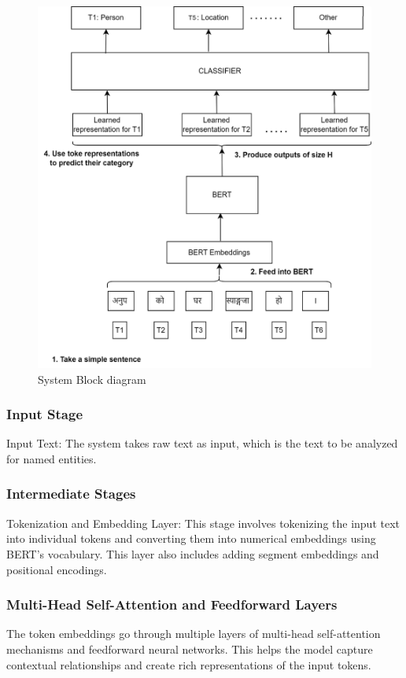  \begin{figure}[H]
\centering
\includegraphics[width=1\textwidth]{img/systemBlock-etc/System Block diagram.png}
\caption[ System Block diagram]{ System Block diagram}

\end{figure}


 \subsubsection {Input Stage}
Input Text: The system takes raw text as input, which is the text to be analyzed for named entities.
\subsubsection{Intermediate Stages}
Tokenization and Embedding Layer: This stage involves tokenizing the input text into individual tokens and converting them into numerical embeddings using BERT's vocabulary. This layer also includes adding segment embeddings and positional encodings.
\subsubsection{Multi-Head Self-Attention and Feedforward Layers}
The token embeddings go through multiple layers of multi-head self-attention mechanisms and feedforward neural networks. This helps the model capture contextual relationships and create rich representations of the input tokens.
